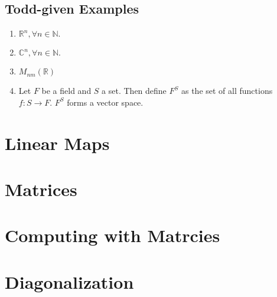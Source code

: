 \documentclass[a4paper,10pt]{article}
\theoremstyle{definition}
\begin{document}
\subsection{Todd-given Examples}
\begin{enumerate}
	\item $\mathbb{R}^n, \forall n \in \mathbb{N}.$ 
	\item $\mathbb{C}^n, \forall n \in \mathbb{N}.$ 
	\item $M_{nm}(\mathbb{R})$
	\item Let $F$ be a field and $S$ a set. Then define $F^S$ as the set of all functions $f: S \rightarrow F$. $F^S$ forms a vector space.
\end{enumerate}

\section{Linear Maps}
\section{Matrices}
\section{Computing with Matrcies}





\section{Diagonalization}
\end{document}
